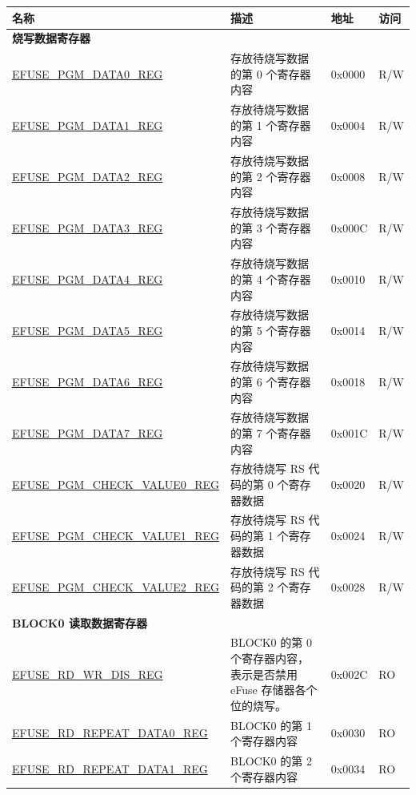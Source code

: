 \begin{longtable}{ | p{7cm} | p{7.2cm} | p{1.3cm} | p{1cm} | }
\hline\rowcolor{lightgray}
名称 & 描述 &  地址 & 访问 \\ \hline
\endhead
\multicolumn{4}{|l|}{\textbf{烧写数据寄存器}} \\ \hline
\hyperref[regdesc:EFUSEPGMDATANREG]{EFUSE\_PGM\_DATA0\_REG} & 存放待烧写数据的第 0 个寄存器内容 & 0x0000 & R/W \\ \hline
\hyperref[regdesc:EFUSEPGMDATANREG]{EFUSE\_PGM\_DATA1\_REG} & 存放待烧写数据的第 1 个寄存器内容 & 0x0004 & R/W \\ \hline
\hyperref[regdesc:EFUSEPGMDATANREG]{EFUSE\_PGM\_DATA2\_REG} & 存放待烧写数据的第 2 个寄存器内容 & 0x0008 & R/W \\ \hline
\hyperref[regdesc:EFUSEPGMDATANREG]{EFUSE\_PGM\_DATA3\_REG} & 存放待烧写数据的第 3 个寄存器内容 & 0x000C & R/W \\ \hline
\hyperref[regdesc:EFUSEPGMDATANREG]{EFUSE\_PGM\_DATA4\_REG} & 存放待烧写数据的第 4 个寄存器内容 & 0x0010 & R/W \\ \hline
\hyperref[regdesc:EFUSEPGMDATANREG]{EFUSE\_PGM\_DATA5\_REG} & 存放待烧写数据的第 5 个寄存器内容 & 0x0014 & R/W \\ \hline
\hyperref[regdesc:EFUSEPGMDATANREG]{EFUSE\_PGM\_DATA6\_REG} & 存放待烧写数据的第 6 个寄存器内容 & 0x0018 & R/W \\ \hline
\hyperref[regdesc:EFUSEPGMDATANREG]{EFUSE\_PGM\_DATA7\_REG} & 存放待烧写数据的第 7 个寄存器内容 & 0x001C & R/W \\ \hline
\hyperref[regdesc:EFUSEPGMCHECKVALUEMREG]{EFUSE\_PGM\_CHECK\_VALUE0\_REG} & 存放待烧写 RS 代码的第 0 个寄存器数据 & 0x0020 & R/W \\ \hline
\hyperref[regdesc:EFUSEPGMCHECKVALUEMREG]{EFUSE\_PGM\_CHECK\_VALUE1\_REG} & 存放待烧写 RS 代码的第 1 个寄存器数据 & 0x0024 & R/W \\ \hline
\hyperref[regdesc:EFUSEPGMCHECKVALUEMREG]{EFUSE\_PGM\_CHECK\_VALUE2\_REG} & 存放待烧写 RS 代码的第 2 个寄存器数据 & 0x0028 & R/W \\ \hline
\multicolumn{4}{|l|}{\textbf{BLOCK0 读取数据寄存器}} \\ \hline
\hyperref[regdesc:EFUSERDWRDISREG]{EFUSE\_RD\_WR\_DIS\_REG} & BLOCK0 的第 0 个寄存器内容，表示是否禁用 eFuse 存储器各个位的烧写。& 0x002C & RO \\ \hline
\hyperref[regdesc:EFUSERDREPEATDATA0REG]{EFUSE\_RD\_REPEAT\_DATA0\_REG} & BLOCK0 的第 1 个寄存器内容 & 0x0030 & RO \\ \hline
\hyperref[regdesc:EFUSERDREPEATDATA1REG]{EFUSE\_RD\_REPEAT\_DATA1\_REG} & BLOCK0 的第 2 个寄存器内容 & 0x0034 & RO \\ \hline

\end{longtable}
